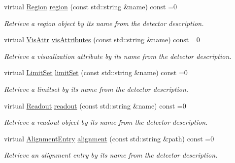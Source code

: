 \begin{DoxyCompactItemize}
virtual \hyperlink{class_d_d4hep_1_1_geometry_1_1_region}{Region} \hyperlink{class_d_d4hep_1_1_geometry_1_1_l_c_d_d_adbe06759881707fe995472c03810c0ff}{region} (const std\+::string \&name) const =0
\begin{DoxyCompactList}\small\item\em Retrieve a region object by it\textquotesingle{}s name from the detector description. \end{DoxyCompactList}\item 
virtual \hyperlink{class_d_d4hep_1_1_geometry_1_1_vis_attr}{Vis\+Attr} \hyperlink{class_d_d4hep_1_1_geometry_1_1_l_c_d_d_a449330acbb5a5d6ba6f1fa2d97cea338}{vis\+Attributes} (const std\+::string \&name) const =0
\begin{DoxyCompactList}\small\item\em Retrieve a visualization attribute by it\textquotesingle{}s name from the detector description. \end{DoxyCompactList}\item 
virtual \hyperlink{class_d_d4hep_1_1_geometry_1_1_limit_set}{Limit\+Set} \hyperlink{class_d_d4hep_1_1_geometry_1_1_l_c_d_d_a7e98996675e9c00d6b64010415511813}{limit\+Set} (const std\+::string \&name) const =0
\begin{DoxyCompactList}\small\item\em Retrieve a limitset by it\textquotesingle{}s name from the detector description. \end{DoxyCompactList}\item 
virtual \hyperlink{class_d_d4hep_1_1_geometry_1_1_readout}{Readout} \hyperlink{class_d_d4hep_1_1_geometry_1_1_l_c_d_d_aa29f75fba9942edd7f73226a11c9598e}{readout} (const std\+::string \&name) const =0
\begin{DoxyCompactList}\small\item\em Retrieve a readout object by it\textquotesingle{}s name from the detector description. \end{DoxyCompactList}\item 
virtual \hyperlink{class_d_d4hep_1_1_geometry_1_1_alignment_entry}{Alignment\+Entry} \hyperlink{class_d_d4hep_1_1_geometry_1_1_l_c_d_d_a5661c5a5c9519f58e3044fa66e5393fa}{alignment} (const std\+::string \&path) const =0
\begin{DoxyCompactList}\small\item\em Retrieve an alignment entry by it\textquotesingle{}s name from the detector description. \end{DoxyCompactList}\item 

\end{DoxyCompactItemize}
